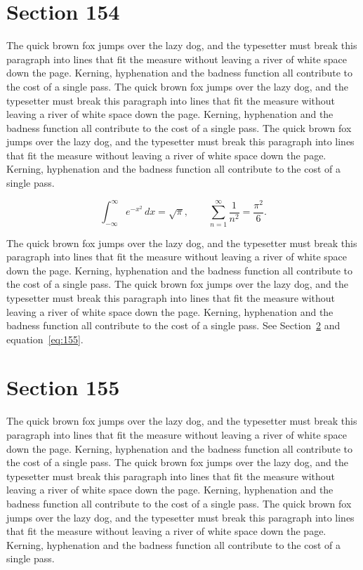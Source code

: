 \documentclass{article}
\begin{document}
\section{Section 154}
\label{sec:154}
The quick brown fox jumps over the lazy dog, and the typesetter must break this paragraph into lines that fit the measure without leaving a river of white space down the page. Kerning, hyphenation and the badness function all contribute to the cost of a single pass. The quick brown fox jumps over the lazy dog, and the typesetter must break this paragraph into lines that fit the measure without leaving a river of white space down the page. Kerning, hyphenation and the badness function all contribute to the cost of a single pass. The quick brown fox jumps over the lazy dog, and the typesetter must break this paragraph into lines that fit the measure without leaving a river of white space down the page. Kerning, hyphenation and the badness function all contribute to the cost of a single pass. 

\begin{equation}\label{eq:154}
\int_{-\infty}^{\infty} e^{-x^{2}}\,dx = \sqrt{\pi}, \qquad
\sum_{n=1}^{\infty} \frac{1}{n^{2}} = \frac{\pi^{2}}{6}.
\end{equation}

The quick brown fox jumps over the lazy dog, and the typesetter must break this paragraph into lines that fit the measure without leaving a river of white space down the page. Kerning, hyphenation and the badness function all contribute to the cost of a single pass. The quick brown fox jumps over the lazy dog, and the typesetter must break this paragraph into lines that fit the measure without leaving a river of white space down the page. Kerning, hyphenation and the badness function all contribute to the cost of a single pass. 
See Section~\ref{sec:155} and equation~\eqref{eq:155}.
\section{Section 155}
\label{sec:155}
The quick brown fox jumps over the lazy dog, and the typesetter must break this paragraph into lines that fit the measure without leaving a river of white space down the page. Kerning, hyphenation and the badness function all contribute to the cost of a single pass. The quick brown fox jumps over the lazy dog, and the typesetter must break this paragraph into lines that fit the measure without leaving a river of white space down the page. Kerning, hyphenation and the badness function all contribute to the cost of a single pass. The quick brown fox jumps over the lazy dog, and the typesetter must break this paragraph into lines that fit the measure without leaving a river of white space down the page. Kerning, hyphenation and the badness function all contribute to the cost of a single pass. 
\end{document}
